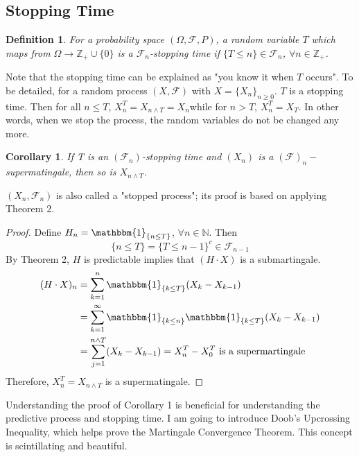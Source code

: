 \documentclass[10pt]{article}
\newtheorem{corollary}{Corollary}
\newtheorem{definition}{Definition}
\begin{document}
\subsection{Stopping Time}
\begin{definition}
For a probability space $(\Omega, \mathcal{F},P)$, a random variable $T$ which maps from $\Omega \to \mathbb{Z}_{+}\cup\{0\}$ is a $\mathcal{F}_n$-stopping time if $\{T \le n\}\in \mathcal{F}_n$, $\forall n \in \mathbb{Z}_{+}$.
\end{definition}
Note that the stopping time can be explained as "you know it when $T$ occurs". To be detailed, for a random process $(X,\mathcal{F})$ with $X=\{X_n\}_{n \ge 0}$. $T$ is a stopping time. Then for all $n \le T$, $X_n^T=X_{n\wedge	 T}=X_n$while for $n >T$, $X_n^T=X_T$. In other words, when we stop the process, the random variables do not be changed any more.
\begin{corollary}
If T is an $(\mathcal{F}_n)$-stopping time and $(X_n)$ is a $(\mathcal{F})_n-$supermatingale, then so is $X_{n \wedge T}$.
\end{corollary}
$(X_n, \mathcal{F}_n)$ is also called a "stopped process";  its proof is based on applying Theorem 2.
\begin{proof}
Define $H_n=\mathbbm{1}_{\{n \le T\}}$, $\forall n \in \mathbb{N}$. Then $$\{n \le T\}=\{T \le n-1\}^c \in \mathcal{F}_{n-1}$$ By Theorem 2, $H$ is predictable implies that $(H \cdot X)$ is a submartingale. 
\begin{align*}
    (H \cdot X)_n &=\sum_{k=1}^{n}\mathbbm{1}_{\{k \le T\}}(X_k-X_{k-1})\\&=\sum_{k=1}^{\infty}\mathbbm{1}_{\{k \le n\}}\mathbbm{1}_{\{k \le T\}}(X_k -X_{k-1})\\&=
    \sum_{j=1}^{n \wedge T}(X_k-X_{k-1})=X_n^T-X_0^T \ \text{is a supermartingale}
\end{align*}
Therefore, $X_n^T=X_{n \wedge T}$ is a supermatingale.
\end{proof}
Understanding the proof of Corollary 1 is beneficial for understanding the predictive process and stopping time. I am going to introduce Doob's  Upcrossing Inequality, which helps prove the Martingale Convergence Theorem. This concept is scintillating and beautiful.
\end{document}

